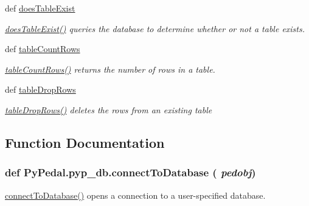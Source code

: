 \begin{CompactItemize}
def \hyperlink{namespacePyPedal_1_1pyp__db_069600ee470533394697567dc1601e96}{does\-Table\-Exist}
\begin{CompactList}\small\item\em \hyperlink{namespacePyPedal_1_1pyp__db_069600ee470533394697567dc1601e96}{does\-Table\-Exist()} queries the database to determine whether or not a table exists. \item\end{CompactList}\item 
def \hyperlink{namespacePyPedal_1_1pyp__db_f72099782c3e8cc304dcada96aa77d21}{table\-Count\-Rows}
\begin{CompactList}\small\item\em \hyperlink{namespacePyPedal_1_1pyp__db_f72099782c3e8cc304dcada96aa77d21}{table\-Count\-Rows()} returns the number of rows in a table. \item\end{CompactList}\item 
def \hyperlink{namespacePyPedal_1_1pyp__db_b164d7c09eb9d86560432668b491a467}{table\-Drop\-Rows}
\begin{CompactList}\small\item\em \hyperlink{namespacePyPedal_1_1pyp__db_b164d7c09eb9d86560432668b491a467}{table\-Drop\-Rows()} deletes the rows from an existing table \item\end{CompactList}\end{CompactItemize}


\subsection{Function Documentation}
\hypertarget{namespacePyPedal_1_1pyp__db_cad3d0a6a0c643e81c8135aff1d1ad37}{
\subsubsection[connectToDatabase]{\setlength{\rightskip}{0pt plus 5cm}def Py\-Pedal.pyp\_\-db.connect\-To\-Database ( {\em pedobj})}}
\label{namespacePyPedal_1_1pyp__db_cad3d0a6a0c643e81c8135aff1d1ad37}


\hyperlink{namespacePyPedal_1_1pyp__db_cad3d0a6a0c643e81c8135aff1d1ad37}{connect\-To\-Database()} opens a connection to a user-specified database. 

